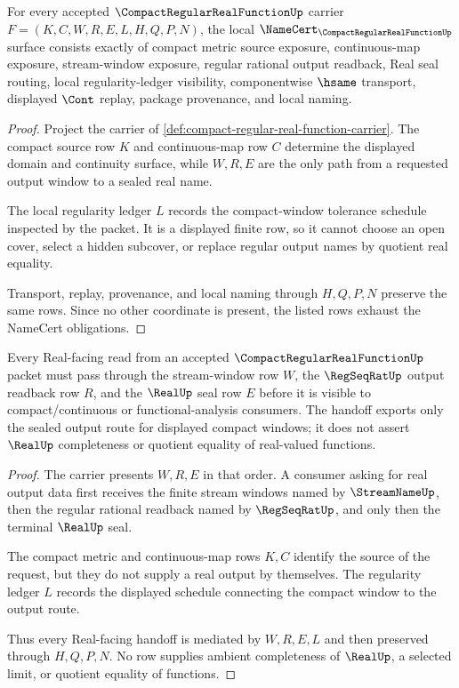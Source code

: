 \begin{theorem}
\label{thm:compact-regular-real-function-namecert-obligations}
For every accepted $\CompactRegularRealFunctionUp$ carrier $F=(K,C,W,R,E,L,H,Q,P,N)$, the local $\NameCert_{\CompactRegularRealFunctionUp}$ surface consists exactly of compact metric source exposure, continuous-map exposure, stream-window exposure, regular rational output readback, Real seal routing, local regularity-ledger visibility, componentwise $\hsame$ transport, displayed $\Cont$ replay, package provenance, and local naming.
\end{theorem}
\begin{proof}
Project the carrier of \autoref{def:compact-regular-real-function-carrier}. The compact source row $K$ and continuous-map row $C$ determine the displayed domain and continuity surface, while $W,R,E$ are the only path from a requested output window to a sealed real name.

The local regularity ledger $L$ records the compact-window tolerance schedule inspected by the packet. It is a displayed finite row, so it cannot choose an open cover, select a hidden subcover, or replace regular output names by quotient real equality.

Transport, replay, provenance, and local naming through $H,Q,P,N$ preserve the same rows. Since no other coordinate is present, the listed rows exhaust the NameCert obligations.
\end{proof}

\begin{theorem}
\label{thm:compact-regular-real-function-real-seal-handoff}
Every Real-facing read from an accepted $\CompactRegularRealFunctionUp$ packet must pass through the stream-window row $W$, the $\RegSeqRatUp$ output readback row $R$, and the $\RealUp$ seal row $E$ before it is visible to compact/continuous or functional-analysis consumers. The handoff exports only the sealed output route for displayed compact windows; it does not assert $\RealUp$ completeness or quotient equality of real-valued functions.
\end{theorem}
\begin{proof}
The carrier presents $W,R,E$ in that order. A consumer asking for real output data first receives the finite stream windows named by $\StreamNameUp$, then the regular rational readback named by $\RegSeqRatUp$, and only then the terminal $\RealUp$ seal.

The compact metric and continuous-map rows $K,C$ identify the source of the request, but they do not supply a real output by themselves. The regularity ledger $L$ records the displayed schedule connecting the compact window to the output route.

Thus every Real-facing handoff is mediated by $W,R,E,L$ and then preserved through $H,Q,P,N$. No row supplies ambient completeness of $\RealUp$, a selected limit, or quotient equality of functions.
\end{proof}

